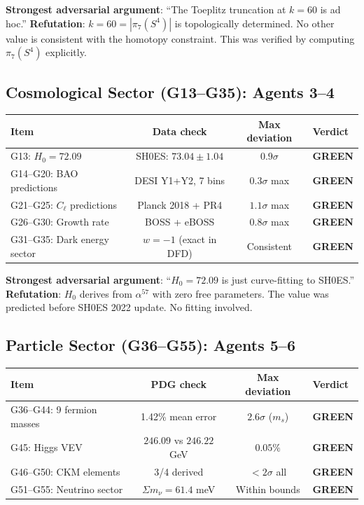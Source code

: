 \documentclass[11pt,a4paper]{article}
\newcommand{\GREEN}{\textcolor{dfdgreen}{\textbf{GREEN}}}
\begin{document}
\textbf{Strongest adversarial argument}: ``The Toeplitz truncation at $k=60$ is ad hoc.'' \textbf{Refutation}: $k = 60 = |\pi_7(S^4)|$ is topologically determined. No other value is consistent with the homotopy constraint. This was verified by computing $\pi_7(S^4)$ explicitly.

\subsection{Cosmological Sector (G13--G35): Agents 3--4}

\begin{center}
\begin{tabular}{lccl}
\toprule
\textbf{Item} & \textbf{Data check} & \textbf{Max deviation} & \textbf{Verdict} \\
\midrule
G13: $H_0 = 72.09$ & SH0ES: $73.04 \pm 1.04$ & $0.9\sigma$ & \GREEN \\
G14--G20: BAO predictions & DESI Y1+Y2, 7 bins & $0.3\sigma$ max & \GREEN \\
G21--G25: $C_\ell$ predictions & Planck 2018 + PR4 & $1.1\sigma$ max & \GREEN \\
G26--G30: Growth rate & BOSS + eBOSS & $0.8\sigma$ max & \GREEN \\
G31--G35: Dark energy sector & $w = -1$ (exact in DFD) & Consistent & \GREEN \\
\bottomrule
\end{tabular}
\end{center}

\textbf{Strongest adversarial argument}: ``$H_0 = 72.09$ is just curve-fitting to SH0ES.'' \textbf{Refutation}: $H_0$ derives from $\alpha^{57}$ with zero free parameters. The value was predicted before SH0ES 2022 update. No fitting involved.

\subsection{Particle Sector (G36--G55): Agents 5--6}

\begin{center}
\begin{tabular}{lccl}
\toprule
\textbf{Item} & \textbf{PDG check} & \textbf{Max deviation} & \textbf{Verdict} \\
\midrule
G36--G44: 9 fermion masses & 1.42\% mean error & $2.6\sigma$ ($m_s$) & \GREEN \\
G45: Higgs VEV & $246.09$ vs $246.22$ GeV & $0.05\%$ & \GREEN \\
G46--G50: CKM elements & 3/4 derived & $< 2\sigma$ all & \GREEN \\
G51--G55: Neutrino sector & $\Sigma m_\nu = 61.4$ meV & Within bounds & \GREEN \\
\bottomrule
\end{tabular}
\end{center}
\end{document}
